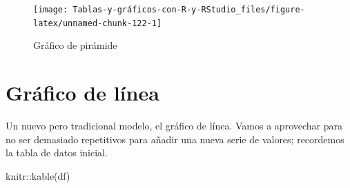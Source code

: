 \documentclass[
]{book}
\newenvironment{Shaded}{\begin{snugshade}}{\end{snugshade}}
\newcommand{\AttributeTok}[1]{\textcolor[rgb]{0.77,0.63,0.00}{#1}}
\newcommand{\ConstantTok}[1]{\textcolor[rgb]{0.00,0.00,0.00}{#1}}
\newcommand{\FunctionTok}[1]{\textcolor[rgb]{0.00,0.00,0.00}{#1}}
\newcommand{\NormalTok}[1]{#1}
\newcommand{\SpecialCharTok}[1]{\textcolor[rgb]{0.00,0.00,0.00}{#1}}
\newcommand{\StringTok}[1]{\textcolor[rgb]{0.31,0.60,0.02}{#1}}
\begin{document}
\begin{Shaded}
\end{Shaded}

\begin{figure}[H]

{\centering \texttt{[image: Tablas-y-gráficos-con-R-y-RStudio\_files/figure-latex/unnamed-chunk-122-1]} 

}

\caption{Gráfico de pirámide}\label{fig:unnamed-chunk-122}
\end{figure}

\hypertarget{gruxe1fico-de-luxednea}{%
\section{Gráfico de línea}\label{gruxe1fico-de-luxednea}}

Un nuevo pero tradicional modelo, el gráfico de línea. Vamos a aprovechar para no ser demasiado repetitivos para añadir una nueva serie de valores; recordemos la tabla de datos inicial.

\begin{Shaded}
\begin{Highlighting}[]
\NormalTok{knitr}\SpecialCharTok{::}\FunctionTok{kable}\NormalTok{(df)}
\end{Highlighting}
\end{Shaded}
\end{document}
